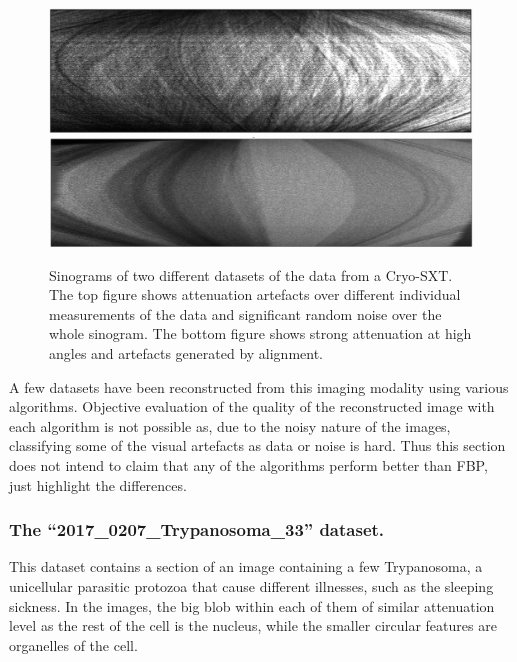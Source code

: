 \begin{figure}
\begin{center}

\includegraphics[width=\textwidth]{Applications/sinobad.png} 
\includegraphics[width=\textwidth]{Applications/sinogrammod.png} 

\end{center}

\caption[Sinograms of the data from a Cryo-SXT]{\label{fig:Cryo-SXT} Sinograms of two different datasets of the data from a Cryo-SXT. The top figure shows attenuation artefacts over different individual measurements of the data and significant random noise over the whole sinogram. The bottom figure shows strong attenuation at high angles and artefacts generated by alignment. } 
\end{figure}




A few datasets have been reconstructed from this imaging modality using various algorithms. Objective evaluation of the quality of the reconstructed image with each algorithm is not possible as, due to the noisy nature of the images, classifying some of the visual artefacts as data or noise is hard. Thus this section does not intend to claim that any of the algorithms perform better than FBP, just highlight the differences.

\subsubsection{The ``2017\_0207\_Trypanosoma\_33'' dataset.} This dataset contains a section of an image containing a few Trypanosoma, a unicellular parasitic protozoa that cause different illnesses, such as the sleeping sickness. In the images, the big blob within each of them of similar attenuation level as the rest of the cell is the nucleus, while the smaller circular features are organelles of the cell.

